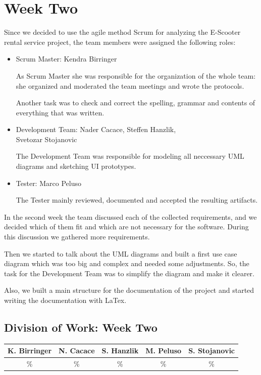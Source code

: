 \documentclass[a4paper, 12pt]{article}
\begin{document}
\section{Week Two}
Since we decided to use the agile method Scrum for analyzing the E-Scooter rental service project, the team members were assigned the following roles:

\begin{itemize}
\item Scrum Master: Kendra Birringer

As Scrum Master she was responsible for the organization of the whole team: she organized and moderated the team meetings and wrote the protocols. 

Another task was to check and correct the spelling, grammar and contents of everything that was written.

\item Development Team: Nader Cacace, Steffen Hanzlik,\\
      Svetozar Stojanovic

The Development Team was responsible for modeling all neccessary UML diagrams and sketching UI prototypes.

\item Tester: Marco Peluso

The Tester mainly reviewed, documented and accepted the resulting artifacts.
\end{itemize}

In the second week the team discussed each of the collected requirements, and we decided which of them fit and which are not necessary for the software. During this discussion we gathered more requirements.

Then we started to talk about the UML diagrams and built a first use case diagram which was too big and complex and needed some adjustments. So, the task for the Development Team was to simplify the diagram and make it clearer.

Also, we built a main structure for the documentation of the project and started writing the documentation with LaTex. 

\subsection{Division of Work: Week Two}

\begin{table}[htbp]
\centering
\setlength{\tabcolsep}{10pt}
\begin{tabular}{|c|c|c|c|c|}
\hline
K. Birringer & N. Cacace & S. Hanzlik & M. Peluso & S. Stojanovic\\
\hline
\% & \% & \% & \% & \% \\ 
\hline
\end{tabular}
\end{table}
\end{document}
